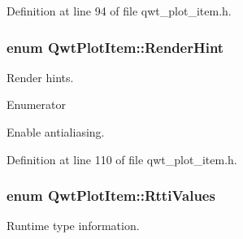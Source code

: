 Definition at line 94 of file qwt\-\_\-plot\-\_\-item.\-h.

\hypertarget{class_qwt_plot_item_abe0e8a39aceef9a600b73e02550a9704}{
\subsubsection[{Render\-Hint}]{\setlength{\rightskip}{0pt plus 5cm}enum {\bf Qwt\-Plot\-Item\-::\-Render\-Hint}}}\label{class_qwt_plot_item_abe0e8a39aceef9a600b73e02550a9704}


Render hints. 

\begin{Desc}
\item[Enumerator]\par
\begin{description}
\item[{\em 
\hypertarget{class_qwt_plot_item_abe0e8a39aceef9a600b73e02550a9704ae0c9811915d496eaacbd749724647f13}{Render\-Antialiased}\label{class_qwt_plot_item_abe0e8a39aceef9a600b73e02550a9704ae0c9811915d496eaacbd749724647f13}
}]Enable antialiasing. \end{description}
\end{Desc}


Definition at line 110 of file qwt\-\_\-plot\-\_\-item.\-h.

\hypertarget{class_qwt_plot_item_ab149ac85e233ce9cedf2f2f2af871bf3}{
\subsubsection[{Rtti\-Values}]{\setlength{\rightskip}{0pt plus 5cm}enum {\bf Qwt\-Plot\-Item\-::\-Rtti\-Values}}}\label{class_qwt_plot_item_ab149ac85e233ce9cedf2f2f2af871bf3}


Runtime type information. 

